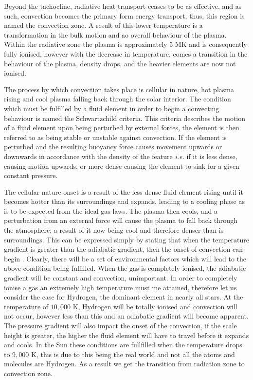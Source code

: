 Beyond the tachocline, radiative heat transport ceases to be as effective, and as such, convection becomes the primary form energy transport, thus, this region is named the convection zone. 
A result of this lower temperature is a transformation in the bulk motion and ao overall behaviour of the plasma.
Within the radiative zone the plasma is approximately $5$ MK and is consequently fully ionised, however with the decrease in temperature, comes a transition in the behaviour of the plasma, density drops, and the heavier elements are now not ionised.

The process by which convection takes place is cellular in nature, hot plasma rising and cool plasma falling back through the solar interior.
The condition which must be fulfilled by a fluid element in order to begin a convecting behaviour is named the Schwartzchild criteria.
This criteria describes the motion of a fluid element upon being perturbed by external forces, the element is then referred to as being stable or unstable against convection.
If the element is perturbed and the resulting buoyancy force causes movement upwards or downwards in accordance with the density of the feature \emph{i.e.} if it is less dense, causing motion upwards, or more dense causing the element to sink for a given constant pressure.

The cellular nature onset is a result of the less dense fluid element rising until it becomes hotter than its surroundings and expands, leading to a cooling phase as is to be expected from the ideal gas laws.
The plasma then cools, and a perturbation from an external force will cause the plasma to fall back through the atmosphere; a result of it now being cool and therefore denser than is surroundings.
This can be expressed simply by stating that when the temperature gradient is greater than the adiabatic gradient, then the onset of convection can begin \cite{Hansen2004}.
Clearly, there will be a set of environmental factors which will lead to the above condition being fulfilled.
When the gas is completely ionised, the adiabatic gradient will be constant and convection, unimportant.
In order to completely ionise a gas an extremely high temperature must me attained, therefore let us consider the case for Hydrogen, the dominant element in nearly all stars.
At the temperature of $10,000$ K, Hydrogen will be totally ionised and convection will not occur, however less than this and an adiabatic gradient will become apparent.
The pressure gradient will also impact the onset of the convection, if the scale height is greater, the higher the fluid element will have to travel before it expands and cools.
In the Sun these conditions are fullfilled when the temperature drops to $9,000$ K, this is due to this being the real world and not all the atoms and molecules are Hydrogen.
As a result we get the transition from radiation zone to convection zone.

